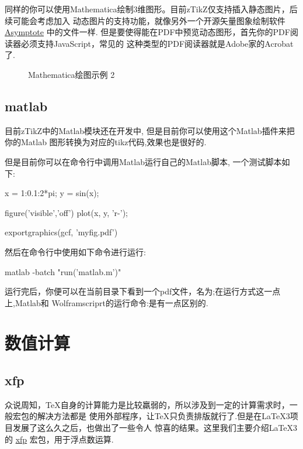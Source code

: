 同样的你可以使用Mathematica绘制3维图形。目前zTikZ仅支持插入静态图片，后续可能会考虑加入 
动态图片的支持功能，就像另外一个开源矢量图象绘制软件\href{https://asymptote.sourceforge.io/}{Asymptote}
中的文件一样. 但是要使得能在PDF中预览动态图形，首先你的PDF阅读器必须支持JavaScript，常见的
这种类型的PDF阅读器就是Adobe家的Acrobat了.

\begin{figure}[!htb]
    \centering
    
    \caption{Mathematica绘图示例 2}
    \label{fig:mma-fig-2}
\end{figure}

\subsection{matlab}
目前zTikZ中的Matlab模块还在开发中, 但是目前你可以使用这个Matlab插件来把你的Matlab
图形转换为对应的tikz代码,效果也是很好的.

但是目前你可以在命令行中调用Matlab运行自己的Matlab脚本, 一个测试脚本如下:
\begin{codeprint}
x = 1:0.1:2*pi;
y = sin(x);

figure('visible','off')
plot(x, y, 'r-');

exportgraphics(gcf, 'myfig.pdf') 
\end{codeprint}

然后在命令行中使用如下命令进行运行:
\begin{codeprint}
matlab -batch "run('matlab.m')"
\end{codeprint}

运行完后，你便可以在当前目录下看到一个pdf文件，名为;在运行方式这一点上,Matlab和
Wolframscriprt的运行命令:是有一点区别的.

\section{数值计算}
\subsection{xfp}
众说周知，\TeX{}自身的计算能力是比较羸弱的，所以涉及到一定的计算需求时，一般宏包的解决方法都是
使用外部程序，让\TeX{}只负责排版就行了.但是在\LaTeX3项目发展了这么久之后，也做出了一些令人 
惊喜的结果。这里我们主要介绍\LaTeX3的 \href{https://www.ctan.org/pkg/xfp}{xfp} 宏包，用于浮点数运算. 

